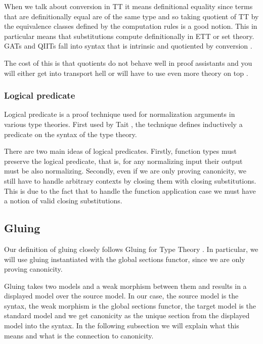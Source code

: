 When we talk about conversion in TT it means definitional equality since terms that are definitionally equal are of the same type and so taking quotient of TT by the equivalence classes defined by the computation rules is a good notion. This in particular means that substitutions compute definitionally in ETT or set theory. GATs and QIITs fall into syntax that is intrinsic and quotiented by conversion \cite{altenkirch2016type}.

The cost of this is that quotients do not behave well in proof assistants and you will either get into transport hell or will have to use even more theory on top \cite{pedrot2020russian, loic2025strict, kaposi2019shallow}.

\subsubsection{Logical predicate}

Logical predicate is a proof technique used for normalization arguments in various type theories. First used by Tait \cite{tait1967intensional}, the technique defines inductively a predicate on the syntax of the type theory.

There are two main ideas of logical predicates. Firstly, function types must preserve the logical predicate, that is, for any normalizing input their output must be also normalizing. Secondly, even if we are only proving canonicity, we still have to handle arbitrary contexts by closing them with closing substitutions. This is due to the fact that to handle the function application case we must have a notion of valid closing substitutions.

\subsection{Gluing}

Our definition of gluing closely follows Gluing for Type Theory \cite{kaposi2019gluing}. In particular, we will use gluing instantiated with the global sections functor, since we are only proving canonicity.

Gluing takes two models and a weak morphism between them and results in a displayed model over the source model. In our case, the source model is the syntax, the weak morphism is the global sections functor, the target model is the standard model and we get canonicity as the unique section from the displayed model into the syntax. In the following subsection we will explain what this means and what is the connection to canonicity.

